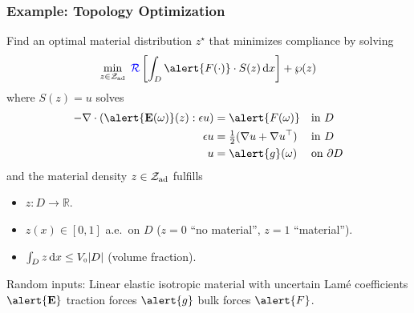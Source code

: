 \documentclass[aspectratio=169,xcolor=dvipsnames,10pt]{beamer}
\newcommand{\Zad}{\mathcal{Z}_{\text{\textup{ad}}}}
\newcommand{\risk}{\mathcal{R}}
\begin{document}
\begin{frame}\frametitle{Example: Topology Optimization}

\begin{block}{}
Find an optimal material distribution $z^{\star}$ that minimizes compliance by solving
      \[
      \min_{z \in \Zad}\;
         {\color{blue}\risk}\left[
            \int_D \alert{F(\cdot)}\cdot S(z)\,\mathrm{d}x\right] + \wp(z)
      \]
      where $S(z)=u$ solves \vspace{-1ex}
      \begin{align*}
        -\nabla\cdot(\alert{\mathbf{E}(\omega)}(z):\epsilon u)
            =&\; \alert{F(\omega)} &&\text{in }D\textcolor{white}{.} \\
        \epsilon u =&\;
           \tfrac{1}{2}(\nabla u + \nabla u^\top)
           &&\text{in }D\textcolor{white}{.}\\
         u =&\; \alert{g}(\omega) &&\text{on }\partial D
      \end{align*}
and the material density $z \in \Zad$ fulfills 
\begin{itemize}
\item $z : D \to \mathbb R$.
\item $z(x) \in [0,1]$ a.e.\ on $D$ ($z = 0$ ``no material'', $z = 1$ ``material'').
\item  $\int_D z\,\mathrm{d}x \le V_{\textup{\tiny 0}}|D|$ (volume fraction).
\end{itemize}
 
Random inputs: Linear elastic isotropic material with \alert{uncertain}
Lam\'e coefficients $\alert{\mathbf{E}}$
traction forces $\alert{g}$ 
 bulk forces $\alert{F}$.

\end{block}
\end{frame}
\end{document}
